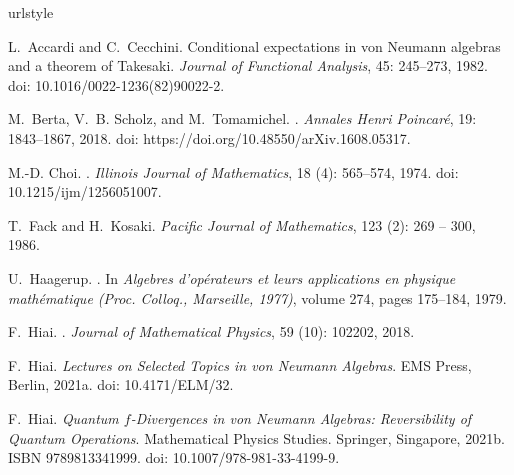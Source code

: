 \documentclass[12pt]{article}
\theoremstyle{definition}
\theoremstyle{remark}
\numberwithin{equation}{section}
\begin{document}
\begin{thebibliography}{24}
\providecommand{\natexlab}[1]{#1}
\providecommand{\url}[1]{\texttt{#1}}
\expandafter\ifx\csname urlstyle\endcsname\relax
  \providecommand{\doi}[1]{doi: #1}\else
  \providecommand{\doi}{doi: \begingroup \urlstyle{rm}\Url}\fi

L.~Accardi and C.~Cecchini.
\newblock Conditional expectations in von {Neumann} algebras and a theorem of
  {T}akesaki.
\newblock \emph{Journal of Functional Analysis}, 45: 245--273, 1982.
\newblock \doi{10.1016/0022-1236(82)90022-2}.

M.~Berta, V.~B. Scholz, and M.~Tomamichel.
.
\newblock \emph{Annales Henri Poincar{\'e}}, 19: 1843--1867, 2018.
\newblock \doi{https://doi.org/10.48550/arXiv.1608.05317}.

M.-D. Choi.
.
\newblock \emph{Illinois Journal of Mathematics}, 18 (4):
  565--574, 1974.
\newblock \doi{10.1215/ijm/1256051007}.

T.~Fack and H.~Kosaki.
\newblock \emph{Pacific Journal of Mathematics}, 123 (2): 269
  -- 300, 1986.

U.~Haagerup.
.
\newblock In \emph{Algebres d’op{\'e}rateurs et leurs applications en
  physique math{\'e}matique (Proc. Colloq., Marseille, 1977)}, volume 274,
  pages 175--184, 1979.

F.~Hiai.
.
\newblock \emph{Journal of Mathematical Physics}, 59 (10):
  102202, 2018.

\bibitem[Hiai(2021{\natexlab{a}})]{hiai2021lectures}
F.~Hiai.
\newblock \emph{Lectures on Selected Topics in von Neumann Algebras}.
\newblock EMS Press, Berlin, 2021{\natexlab{a}}.
\newblock \doi{10.4171/ELM/32}.

\bibitem[Hiai(2021{\natexlab{b}})]{hiai2021quantum}
F.~Hiai.
\newblock \emph{Quantum $f$-Divergences in von Neumann Algebras: Reversibility
  of Quantum Operations}.
\newblock Mathematical Physics Studies. Springer, Singapore,
  2021{\natexlab{b}}.
\newblock ISBN 9789813341999.
\newblock \doi{10.1007/978-981-33-4199-9}.


\end{thebibliography}
\end{document}
